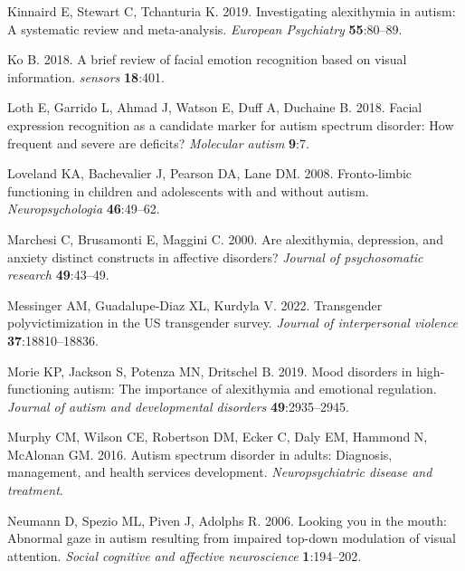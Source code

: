 \documentclass[
]{article}
\newlength{\cslhangindent}
\newlength{\cslentryspacingunit} %
\newenvironment{CSLReferences}[2] %
 {%
  \setlength{\parindent}{0pt}
  \ifodd #1
  \let\oldpar\par
  \def\par{\hangindent=\cslhangindent\oldpar}
  \fi
  \setlength{\parskip}{#2\cslentryspacingunit}
 }%
 {}
\begin{document}
\begin{CSLReferences}{1}{0}
\leavevmode{}%
Kinnaird E, Stewart C, Tchanturia K. 2019. Investigating alexithymia in autism: A systematic review and meta-analysis. \emph{European Psychiatry} \textbf{55}:80--89.

\leavevmode{}%
Ko B. 2018. A brief review of facial emotion recognition based on visual information. \emph{sensors} \textbf{18}:401.

\leavevmode{}%
Loth E, Garrido L, Ahmad J, Watson E, Duff A, Duchaine B. 2018. Facial expression recognition as a candidate marker for autism spectrum disorder: How frequent and severe are deficits? \emph{Molecular autism} \textbf{9}:7.

\leavevmode{}%
Loveland KA, Bachevalier J, Pearson DA, Lane DM. 2008. Fronto-limbic functioning in children and adolescents with and without autism. \emph{Neuropsychologia} \textbf{46}:49--62.

\leavevmode{}%
Marchesi C, Brusamonti E, Maggini C. 2000. Are alexithymia, depression, and anxiety distinct constructs in affective disorders? \emph{Journal of psychosomatic research} \textbf{49}:43--49.

\leavevmode{}%
Messinger AM, Guadalupe-Diaz XL, Kurdyla V. 2022. Transgender polyvictimization in the US transgender survey. \emph{Journal of interpersonal violence} \textbf{37}:18810--18836.

\leavevmode{}%
Morie KP, Jackson S, Potenza MN, Dritschel B. 2019. Mood disorders in high-functioning autism: The importance of alexithymia and emotional regulation. \emph{Journal of autism and developmental disorders} \textbf{49}:2935--2945.

\leavevmode{}%
Murphy CM, Wilson CE, Robertson DM, Ecker C, Daly EM, Hammond N, McAlonan GM. 2016. Autism spectrum disorder in adults: Diagnosis, management, and health services development. \emph{Neuropsychiatric disease and treatment}.

\leavevmode{}%
Neumann D, Spezio ML, Piven J, Adolphs R. 2006. Looking you in the mouth: Abnormal gaze in autism resulting from impaired top-down modulation of visual attention. \emph{Social cognitive and affective neuroscience} \textbf{1}:194--202.


\end{CSLReferences}
\end{document}
